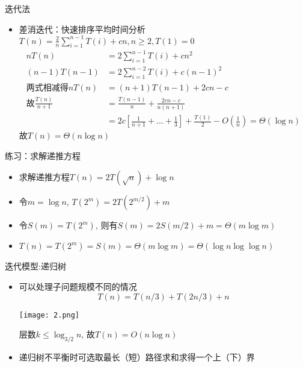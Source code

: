 \documentclass{ctexbeamer}
\begin{document}
    \begin{frame}{迭代法}
        \begin{itemize}
            \item 差消迭代：快速排序平均时间分析\\
            $T(n)=\frac{2}{n}\sum\limits_{i=1}^{n-1}T(i)+cn, n\geq 2, T(1) = 0$
            \begin{align*}
            nT(n)&=2\sum_{i=1}^{n-1}T(i)+cn^2\\
            (n-1)T(n-1)&=2\sum_{i=1}^{n-2}T(i)+c(n-1)^2\\
            \text{两式相减得} nT(n)&=(n+1)T(n-1)+2cn-c\\
            \text{故} \frac{T(n)}{n+1}&=\frac{T(n-1)}{n}+\frac{2cn-c}{n(n+1)}\\
            &=2c[\frac{1}{n+1}+...+\frac{1}{3}]+\frac{T(1)}{2}-O(\frac{1}{n})=\Theta(\log n)
            \end{align*}
            故$T(n)=\Theta(n\log n)$
        \end{itemize}
    \end{frame}

    \begin{frame}{练习：求解递推方程}
    \begin{itemize}
        \setlength{\itemsep}{2em}
    \item 
    求解递推方程$T(n)=2T(\sqrt{n})+\log n$
    \pause
    \item 令$m=\log n$, $T(2^m)=2T(2^{m/2})+m$
    \item 令$S(m)=T(2^m)$, 则有$S(m)=2S(m/2)+m=\Theta(m\log m)$
    \item $T(n)=T(2^m)=S(m)=\Theta(m\log m) = \Theta(\log n \log\log n)$
    \end{itemize}
    \end{frame}

    \begin{frame}{迭代模型:递归树}
    \begin{itemize}
    \item 可以处理子问题规模不同的情况
    $$T(n)=T(n/3)+T(2n/3)+n$$
    \begin{center}\texttt{[image: 2.png]}\end{center}
    层数$k \leq \log_{3/2}n$, 故$T(n)=O(n\log n)$
    \item 递归树不平衡时可选取最长（短）路径求和求得一个上（下）界
    \end{itemize}
    \end{frame}
    
\end{document}
